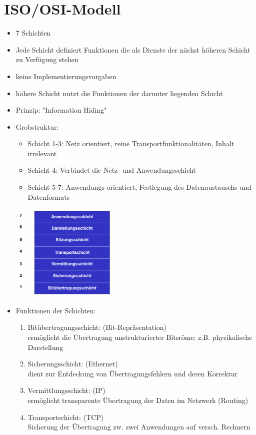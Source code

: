 \documentclass{scrreprt}
\begin{document}
\section{ISO/OSI-Modell}
\begin{itemize}
	\item 7 Schichten
	\item Jede Schicht definiert Funktionen die als Dienste der nächst höheren Schicht zu Verfügung stehen
	\item keine Implementierungsvorgaben
	\item höhere Schicht nutzt die Funktionen der darunter liegenden Schicht
	\item Prinzip: "Information Hiding"
	\item Grobstruktur:
	\begin{itemize}
		\item Schicht 1-3: Netz orientiert, reine Transportfunktionalitäten, Inhalt irrelevant
		\item Schicht 4: Verbindet die Netz- und Anwendungsschicht
		\item Schicht 5-7: Anwendungs orientiert, Festlegung des Datenaustauschs und Datenformats
	\end{itemize}
	\includegraphics[width=0.4\textwidth]{"graphics/ISO"}
	\item Funktionen der Schichten:
	\begin{enumerate}
		\item Bitübertragungsschicht: (Bit-Repräsentation)
		\\ermöglicht die Übertragung unstrukturierter Bitsröme; z.B. physikalische Darstellung
		\item Sicherungsschicht: (Ethernet)
		\\dient zur Entdeckung von Übertragungsfehlern und deren Korrektur
		\item Vermittlungsschicht: (IP)
		\\ermöglicht transparente Übertragung der Daten im Netzwerk (Routing)
		\item Transportschicht: (TCP)
		\\Sicherung der Übertragung zw. zwei Anwendungen auf versch. Rechnern

\end{enumerate}
\end{itemize}
\end{document}

